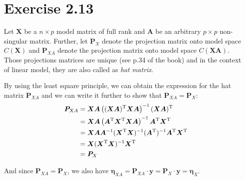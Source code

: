 \section*{Exercise 2.13}
Let $\bm{X}$ be a $n \times p$ model matrix of full rank and $\bm{A}$ be an arbitrary $p \times p$ non-singular matrix. Further, let $\bm{P}_{X}$ denote the projection matrix onto model space $C(\bm{X})$ and $\bm{P}_{XA}$ denote the projection matrix onto model space $C(\bm{XA})$. Those projections matrices are unique (see p.34 of the book) and in the context of linear model, they are also called as \textit{hat matrix}.

By using the least square principle, we can obtain the expression for the hat matrix $\bm{P}_{XA}$ and we can write it further to show that $\bm{P}_{XA} = \bm{P}_{X}$:
\begin{align*}
\bm{P}_{XA} &= \bm{X}\bm{A}\left((\bm{X}\bm{A})^{\rm T}\bm{X}\bm{A}\right)^{-1}(\bm{X}\bm{A})^{\rm T}\\
&= \bm{X}\bm{A}\left(\bm{A}^{\rm T}\bm{X}^{\rm T}\bm{X}\bm{A} \right)^{-1}\bm{A}^{\rm T}\bm{X}^{\rm T}\\
&= \bm{X}\bm{A}\bm{A}^{-1}(\bm{X}^{\rm T}\bm{X})^{-1}(\bm{A}^{\rm T})^{-1}\bm{A}^{\rm T}\bm{X}^{\rm T}\\
&= \bm{X}(\bm{X}^{\rm T}\bm{X})^{-1}\bm{X}^{\rm T}\\
&= \bm{P}_{X}
\end{align*}

And since $\bm{P}_{XA} = \bm{P}_{X}$, we also have $\bm{\eta}_{XA} = \bm{P}_{XA}\cdot\bm{y} = \bm{P}_{X}\cdot\bm{y} = \bm{\eta}_{X}$.